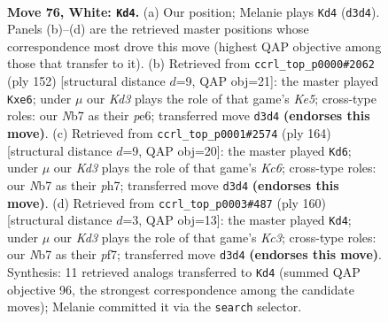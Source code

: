 \documentclass[11pt]{article}
\begin{document}
\clearpage

\begin{figure}[p]\centering
\begin{subfigure}{0.46\textwidth}\centering
\resizebox{\linewidth}{!}{%
\newchessgame
\chessboard[
  setfen={7k/1NP5/2r5/8/8/3K2B1/8/8 w - - 65 76},
  showmover=false,
  pgfstyle=straightmove, color=movearrow, markmove={d3-d4}
]}
\caption{}
\end{subfigure}\hfill
\begin{subfigure}{0.46\textwidth}\centering
\resizebox{\linewidth}{!}{%
\newchessgame
\chessboard[
  setfen={r7/P7/4p3/4K3/2k5/8/5B2/8 w - - 1 77},
  showmover=false,
  pgfstyle=straightmove, color=movearrow, markmove={e5-e6}
]}
\caption{}
\end{subfigure}
\\[4pt]
\begin{subfigure}{0.46\textwidth}\centering
\resizebox{\linewidth}{!}{%
\newchessgame
\chessboard[
  setfen={8/6Bp/2K4P/7r/4k3/8/8/8 w - - 25 83},
  showmover=false,
  pgfstyle=straightmove, color=movearrow, markmove={c6-d6}
]}
\caption{}
\end{subfigure}\hfill
\begin{subfigure}{0.46\textwidth}\centering
\resizebox{\linewidth}{!}{%
\newchessgame
\chessboard[
  setfen={8/1P3p2/3k4/1r6/4B3/2K5/8/8 w - - 35 81},
  showmover=false,
  pgfstyle=straightmove, color=movearrow, markmove={c3-d4}
]}
\caption{}
\end{subfigure}
\caption{\textbf{Move 76, White: \texttt{Kd4}.} (a) Our position; Melanie plays \texttt{Kd4} (\texttt{d3d4}). Panels (b)--(d) are the retrieved master positions whose correspondence most drove this move (highest QAP objective among those that transfer to it). (b) Retrieved from \texttt{ccrl\_top\_p0000\#2062} (ply 152) [structural distance $d$=9, QAP obj=21]: the master played \texttt{Kxe6}; under $\mu$ our \emph{Kd3} plays the role of that game's \emph{Ke5}; cross-type roles: our \emph{N}b7 as their \emph{p}e6; transferred move \texttt{d3d4} \textbf{(endorses this move)}. (c) Retrieved from \texttt{ccrl\_top\_p0001\#2574} (ply 164) [structural distance $d$=9, QAP obj=20]: the master played \texttt{Kd6}; under $\mu$ our \emph{Kd3} plays the role of that game's \emph{Kc6}; cross-type roles: our \emph{N}b7 as their \emph{p}h7; transferred move \texttt{d3d4} \textbf{(endorses this move)}. (d) Retrieved from \texttt{ccrl\_top\_p0003\#487} (ply 160) [structural distance $d$=3, QAP obj=13]: the master played \texttt{Kd4}; under $\mu$ our \emph{Kd3} plays the role of that game's \emph{Kc3}; cross-type roles: our \emph{N}b7 as their \emph{p}f7; transferred move \texttt{d3d4} \textbf{(endorses this move)}. Synthesis: 11 retrieved analogs transferred to \texttt{Kd4} (summed QAP objective 96, the strongest correspondence among the candidate moves); Melanie committed it via the \texttt{search} selector.}
\label{fig:thought-m150}
\end{figure}
\end{document}
